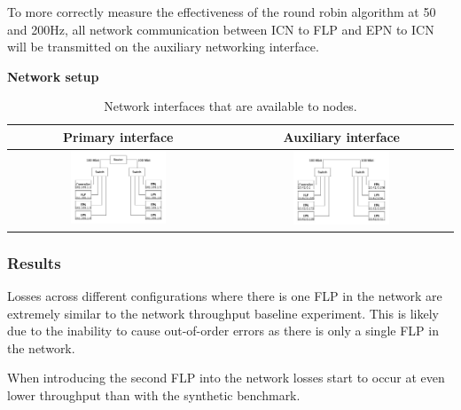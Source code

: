 \documentclass[]{article}
\begin{document}
To more correctly measure the effectiveness of the round robin algorithm at 50 and 200Hz, all network communication between ICN to FLP and EPN to ICN will be transmitted on the auxiliary networking interface.

\begin{table}[H]
	\textbf{Network setup}
	\begin{center}
		\begin{tabular}{ | c | c | }
			\hline
			\textbf{Primary interface} & \textbf{Auxiliary interface} \\ \hline
			
			\includegraphics[width=0.45\textwidth]{images/network-primary-interface} & \includegraphics[width=0.45\textwidth]{images/network-auxiliary-interface} \\ \hline
		\end{tabular}
		\caption{Network interfaces that are available to nodes.}
		\label{tab:networkround}
	\end{center}
\end{table}

\subsubsection{Results}
Losses across different configurations where there is one FLP in the network are extremely similar to the network throughput baseline experiment. This is likely due to the inability to cause out-of-order errors as there is only a single FLP in the network.

When introducing the second FLP into the network losses start to occur at even lower throughput than with the synthetic benchmark.
\end{document}
